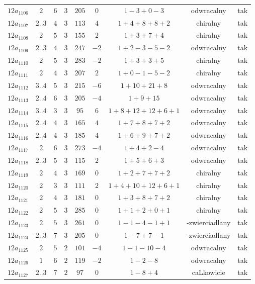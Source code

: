 \begin{longtable}{ccccccccc}
$12a_{1106}$ & $2$ & $6$ & $3$ & $205$ & $0$ & $1-3+0-3$ & odwracalny & tak \\
$12a_{1107}$ & $2..3$ & $4$ & $3$ & $113$ & $4$ & $1+4+8+8+2$ & chiralny & tak \\
$12a_{1108}$ & $2$ & $5$ & $3$ & $155$ & $2$ & $1+3+7+4$ & chiralny & tak \\
$12a_{1109}$ & $2..3$ & $4$ & $3$ & $247$ & $-2$ & $1+2-3-5-2$ & odwracalny & tak \\
$12a_{1110}$ & $2$ & $5$ & $3$ & $283$ & $-2$ & $1+3+3+5$ & chiralny & tak \\
$12a_{1111}$ & $2$ & $4$ & $3$ & $207$ & $2$ & $1+0-1-5-2$ & chiralny & tak \\
$12a_{1112}$ & $3..4$ & $5$ & $3$ & $215$ & $-6$ & $1+10+21+8$ & odwracalny & tak \\
$12a_{1113}$ & $2..4$ & $6$ & $3$ & $205$ & $-4$ & $1+9+15$ & odwracalny & tak \\
$12a_{1114}$ & $3..4$ & $3$ & $3$ & $95$ & $6$ & $1+8+12+12+6+1$ & odwracalny & tak \\
$12a_{1115}$ & $2..4$ & $4$ & $3$ & $165$ & $4$ & $1+7+8+7+2$ & odwracalny & tak \\
$12a_{1116}$ & $2..4$ & $4$ & $3$ & $185$ & $4$ & $1+6+9+7+2$ & odwracalny & tak \\
$12a_{1117}$ & $2$ & $6$ & $3$ & $273$ & $-4$ & $1+4+2-4$ & odwracalny & tak \\
$12a_{1118}$ & $2..3$ & $5$ & $3$ & $115$ & $2$ & $1+5+6+3$ & odwracalny & tak \\
$12a_{1119}$ & $2$ & $4$ & $3$ & $169$ & $0$ & $1+2+7+7+2$ & chiralny & tak \\
$12a_{1120}$ & $2$ & $3$ & $3$ & $111$ & $2$ & $1+4+10+12+6+1$ & chiralny & tak \\
$12a_{1121}$ & $2$ & $4$ & $3$ & $181$ & $0$ & $1+3+8+7+2$ & chiralny & tak \\
$12a_{1122}$ & $2$ & $5$ & $3$ & $285$ & $0$ & $1+1+2+0+1$ & chiralny & tak \\
$12a_{1123}$ & $2$ & $5$ & $3$ & $261$ & $0$ & $1-1-4-1+1$ & -zwierciadlany & tak \\
$12a_{1124}$ & $2..3$ & $7$ & $3$ & $205$ & $0$ & $1-7+7-1$ & -zwierciadlany & tak \\
$12a_{1125}$ & $2$ & $5$ & $2$ & $101$ & $-4$ & $1-1-10-4$ & odwracalny & tak \\
$12a_{1126}$ & $1$ & $6$ & $2$ & $119$ & $-2$ & $1-2-8$ & odwracalny & tak \\
$12a_{1127}$ & $2..3$ & $7$ & $2$ & $97$ & $0$ & $1-8+4$ & caLkowicie & tak \\

\end{longtable}
